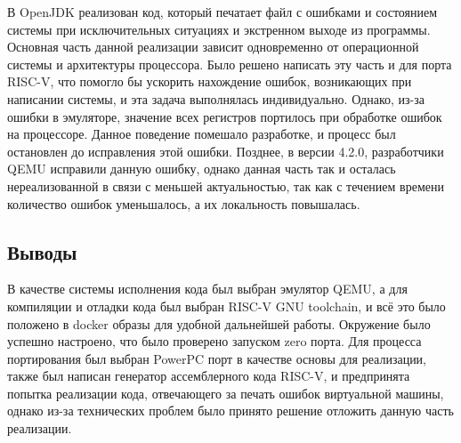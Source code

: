В OpenJDK реализован код, который печатает файл с ошибками и состоянием системы при исключительных ситуациях и экстренном выходе из программы. Основная часть данной реализации зависит одновременно от операционной системы и архитектуры процессора. Было решено написать эту часть и для порта RISC-V, что помогло бы ускорить нахождение ошибок, возникающих при написании системы, и эта задача выполнялась индивидуально. Однако, из-за ошибки в эмуляторе, значение всех регистров портилось при обработке ошибок на процессоре. Данное поведение помешало разработке, и процесс был остановлен до исправления этой ошибки. Позднее, в версии 4.2.0, разработчики QEMU исправили данную ошибку, однако данная часть так и осталась нереализованной в связи с меньшей актуальностью, так как с течением времени количество ошибок уменьшалось, а их локальность повышалась.


\subsection{Выводы}

В качестве системы исполнения кода был выбран эмулятор QEMU, а для компиляции и отладки кода был выбран RISC-V GNU toolchain, и всё это было положено в docker образы для удобной дальнейшей работы. Окружение было успешно настроено, что было проверено запуском zero порта. Для процесса портирования был выбран PowerPC порт в качестве основы для реализации, также был написан генератор ассемблерного кода RISC-V, и предпринята попытка реализации кода, отвечающего за печать ошибок виртуальной машины, однако из-за технических проблем было принято решение отложить данную часть реализации.


